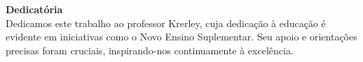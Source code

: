 \vspace*{\fill}

\hspace{8cm}
\begin{minipage}{0.5\textwidth}
    \raggedright
    \textbf{Dedicatória} \\[10pt]
    Dedicamos este trabalho ao professor Krerley, cuja dedicação à educação é evidente em iniciativas como o Novo Ensino Suplementar. Seu apoio e orientações precisas foram cruciais, inspirando-nos continuamente à excelência.
\end{minipage}
\newpage
